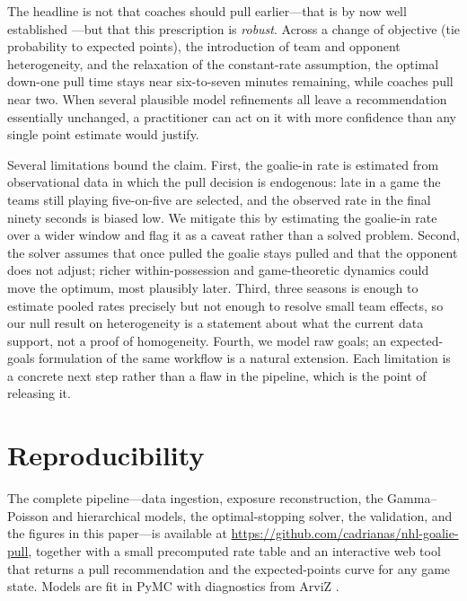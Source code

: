 \documentclass[11pt]{article}
\begin{document}
The headline is not that coaches should pull earlier---that is by now well
established \citep{beaudoin2010strategies,brown2018pulling}---but that this
prescription is \emph{robust}. Across a change of objective (tie probability to
expected points), the introduction of team and opponent heterogeneity, and the
relaxation of the constant-rate assumption, the optimal down-one pull time stays
near six-to-seven minutes remaining, while coaches pull near two. When several
plausible model refinements all leave a recommendation essentially unchanged, a
practitioner can act on it with more confidence than any single point estimate
would justify.

Several limitations bound the claim. First, the goalie-in rate is estimated from
observational data in which the pull decision is endogenous: late in a game the
teams still playing five-on-five are selected, and the observed rate in the final
ninety seconds is biased low. We mitigate this by estimating the goalie-in rate
over a wider window and flag it as a caveat rather than a solved problem. Second,
the solver assumes that once pulled the goalie stays pulled and that the opponent
does not adjust; richer within-possession and game-theoretic dynamics could move
the optimum, most plausibly later. Third, three seasons is enough to estimate pooled
rates precisely but not enough to resolve small team effects, so our null result on
heterogeneity is a statement about what the current data support, not a proof of
homogeneity. Fourth, we model raw goals; an expected-goals formulation of the same
workflow is a natural extension. Each limitation is a concrete next step rather than
a flaw in the pipeline, which is the point of releasing it.

\section{Reproducibility}

The complete pipeline---data ingestion, exposure reconstruction, the Gamma--Poisson
and hierarchical models, the optimal-stopping solver, the validation, and the
figures in this paper---is available at
\url{https://github.com/cadrianas/nhl-goalie-pull}, together with a small
precomputed rate table and an interactive web tool that returns a pull
recommendation and the expected-points curve for any game state. Models are fit in
PyMC \citep{abrilpla2023pymc} with diagnostics from ArviZ
\citep{kumar2019arviz}.



\end{document}
